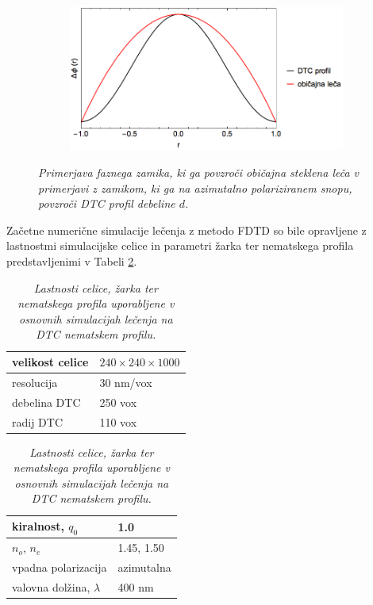 \documentclass[longbibliography,slovene,a4paper,12pt]{book}
\begin{document}
\begin{figure}[h!]
	\centering
	\begin{subfigure}[b]{0.7\textwidth}
	\includegraphics[width=\textwidth]{slike/phase_shift_comparisson.png}
	\end{subfigure}
	\label{fig:phaseshiftcomp}
	\caption{\emph{Primerjava faznega zamika, ki ga povzroči običajna steklena leča v primerjavi z zamikom, ki ga na azimutalno polariziranem snopu, povzroči DTC profil debeline $d$.}}
\end{figure}

Začetne numerične simulacije lečenja z metodo FDTD so bile opravljene z lastnostmi simulacijske celice in parametri žarka ter nematskega profila predstavljenimi v Tabeli \ref{lensingparameters1}.
\begin{table}[h!]
\centering
\caption{\emph{Lastnosti celice, žarka ter nematskega profila uporabljene v osnovnih simulacijah lečenja na DTC nematskem profilu.}}
\label{lensingparameters1}
\begin{tabular}{ll}
\hline
\multicolumn{1}{|l|}{velikost celice}  & \multicolumn{1}{l|}{$240 \times 240 \times 1000$} \\ \hline
\multicolumn{1}{|l|}{resolucija}       & \multicolumn{1}{l|}{30 nm/vox}        \\ \hline
\multicolumn{1}{|l|}{debelina DTC} & \multicolumn{1}{l|}{250 vox}          \\ \hline
\multicolumn{1}{|l|}{radij DTC}    & \multicolumn{1}{l|}{110 vox}          \\ \hline                     
\end{tabular}\quad
\begin{tabular}{ll}
\hline
\multicolumn{1}{|l|}{kiralnost, $q_0$}    & \multicolumn{1}{l|}{1.0}          \\ \hline   
\multicolumn{1}{|l|}{$n_o$, $n_e$}  & \multicolumn{1}{l|}{1.45, 1.50} \\ \hline
\multicolumn{1}{|l|}{vpadna polarizacija}       & \multicolumn{1}{l|}{azimutalna}        \\ \hline
\multicolumn{1}{|l|}{valovna dolžina, $\lambda$} & \multicolumn{1}{l|}{400 nm}          \\ \hline                  
\end{tabular}
\end{table}
\end{document}
